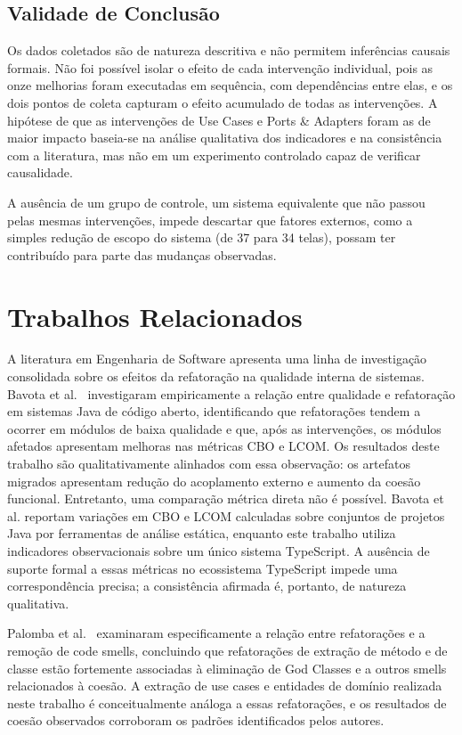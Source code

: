 \documentclass[sigconf,anonymous]{acmart}
\begin{document}
\subsection{Validade de Conclusão}

Os dados coletados são de natureza descritiva e não permitem inferências causais formais. Não foi possível isolar o efeito de cada intervenção individual, pois as onze melhorias foram executadas em sequência, com dependências entre elas, e os dois pontos de coleta capturam o efeito acumulado de todas as intervenções. A hipótese de que as intervenções de Use Cases e Ports \& Adapters foram as de maior impacto baseia-se na análise qualitativa dos indicadores e na consistência com a literatura, mas não em um experimento controlado capaz de verificar causalidade.

A ausência de um grupo de controle, um sistema equivalente que não passou pelas mesmas intervenções, impede descartar que fatores externos, como a simples redução de escopo do sistema (de 37 para 34 telas), possam ter contribuído para parte das mudanças observadas.

\section{Trabalhos Relacionados}

A literatura em Engenharia de Software apresenta uma linha de investigação consolidada sobre os efeitos da refatoração na qualidade interna de sistemas. Bavota et al.~\cite{Bavota2015} investigaram empiricamente a relação entre qualidade e refatoração em sistemas Java de código aberto, identificando que refatorações tendem a ocorrer em módulos de baixa qualidade e que, após as intervenções, os módulos afetados apresentam melhoras nas métricas CBO e LCOM. Os resultados deste trabalho são qualitativamente alinhados com essa observação: os artefatos migrados apresentam redução do acoplamento externo e aumento da coesão funcional. Entretanto, uma comparação métrica direta não é possível. Bavota et al. reportam variações em CBO e LCOM calculadas sobre conjuntos de projetos Java por ferramentas de análise estática, enquanto este trabalho utiliza indicadores observacionais sobre um único sistema TypeScript. A ausência de suporte formal a essas métricas no ecossistema TypeScript impede uma correspondência precisa; a consistência afirmada é, portanto, de natureza qualitativa.

Palomba et al.~\cite{Palomba2014} examinaram especificamente a relação entre refatorações e a remoção de code smells, concluindo que refatorações de extração de método e de classe estão fortemente associadas à eliminação de God Classes e a outros smells relacionados à coesão. A extração de use cases e entidades de domínio realizada neste trabalho é conceitualmente análoga a essas refatorações, e os resultados de coesão observados corroboram os padrões identificados pelos autores.
\end{document}
